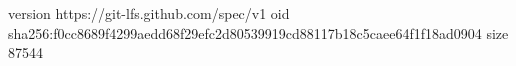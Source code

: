version https://git-lfs.github.com/spec/v1
oid sha256:f0cc8689f4299aedd68f29efc2d80539919cd88117b18c5caee64f1f18ad0904
size 87544
